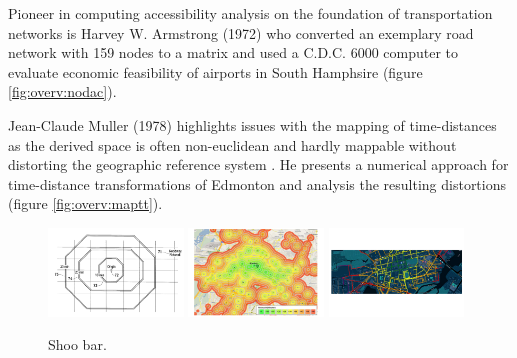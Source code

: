 
    Pioneer in computing accessibility analysis on the foundation of
    transportation networks is Harvey W. Armstrong (1972) who converted an
    exemplary road network with 159 nodes to a matrix and used a C.D.C. 6000
    computer to evaluate economic feasibility of airports in South Hamphsire
    \cite{armstrong1972network} (figure \ref{fig:overv:nodac}).\par

    Jean-Claude Muller (1978) highlights issues with the mapping of
    time-distances as the derived space is often non-euclidean and hardly
    mappable without distorting the geographic reference system
    \cite{muller1978mapping}. He presents a numerical approach for time-distance
    transformations of Edmonton and analysis the resulting distortions (figure
    \ref{fig:overv:maptt}).\par

    \begin{figure}[ht]
      {\includegraphics[width=0.32\textwidth]{./img/overv-patnt.png}}
      \hfill
      {\includegraphics[width=0.32\textwidth]{./img/overv-berln.png}}
      \hfill
      {\includegraphics[width=0.32\textwidth]{./img/overv-potsd.png}}
      \caption{Shoo bar.}
      \label{fig:overv:2}
    \end{figure}

